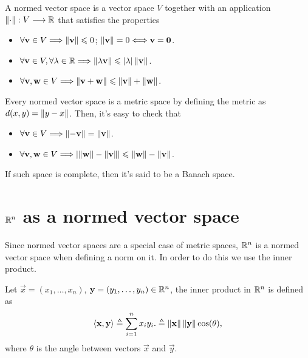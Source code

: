 \begin{defn}
A normed vector space is a vector space $V$ together with an application $\appl{\vnorm{\cdot}}{V}{\R}$ that satisfies the 
properties
\begin{itemize}[itemsep = -2pt]
\item $\forall\mathbf{v}\in V\Longrightarrow \left\Vert \mathbf{v} \right\Vert \leqslant 0$; $\left\Vert \mathbf{v} \right\Vert = 0\Longleftrightarrow \mathbf{v} = \mathbf{0}$.
\item $\forall\vec{v}\in V, \forall\lambda\in\R\implies \vnorm{\lambda\vec{v}}\leq\abs{\lambda}\vnorm{\vec{v}}$.
\item $\forall\mathbf{v}, \mathbf{w}\in V \Longrightarrow \left\Vert \mathbf{v} + \mathbf{w} \right\Vert \leqslant \left\Vert \mathbf{v} \right\Vert + \left\Vert \mathbf{w} \right\Vert$.
\end{itemize}
\end{defn}

\begin{prop}
Every normed vector space is a metric space by defining the metric as $d(x, y) = \left\Vert y - x \right\Vert$. Then, it's easy to check that
\begin{itemize}[itemsep = -2pt]
\item $\forall\mathbf{v}\in V\Longrightarrow \left\Vert -\mathbf{v} \right\Vert = \left\Vert \mathbf{v} \right\Vert$.
\item $\forall\mathbf{v}, \mathbf{w}\in V\Longrightarrow \abs{\left\Vert \mathbf{w} \right\Vert - \left\Vert \mathbf{v} \right\Vert} \leqslant \left\Vert \mathbf{w} \right\Vert - \left\Vert \mathbf{v} \right\Vert$.
\end{itemize}
If such space is complete, then it's said to be a Banach space.
\end{prop}

\section{$\Rtn$ as a normed vector space}

Since normed vector spaces are a special case of metric spaces, $\Rtn$ is a normed vector space when defining a norm on it. In 
order to do this we use the inner product. 

\begin{defn}\label{def:inner-product}
Let $\vec{x} = \left(x_1, \ldots, x_n\right)$, $\vec{y} = \left(y_1, \ldots, y_n\right)\in\Rtn$, the inner product in $\Rtn$
is defined as
\begin{equation}\label{eq:inner-product}
\langle \mathbf{x}, \mathbf{y} \rangle \triangleq \sum_{i=1}^n x_i y_i. \triangleq\left\Vert \mathbf{x} \right\Vert\left\Vert \mathbf{y} \right\Vert\cos(\theta),
\end{equation}
where $\theta$ is the angle between vectors $\vec{x}$ and $\vec{y}$.
\end{defn}

